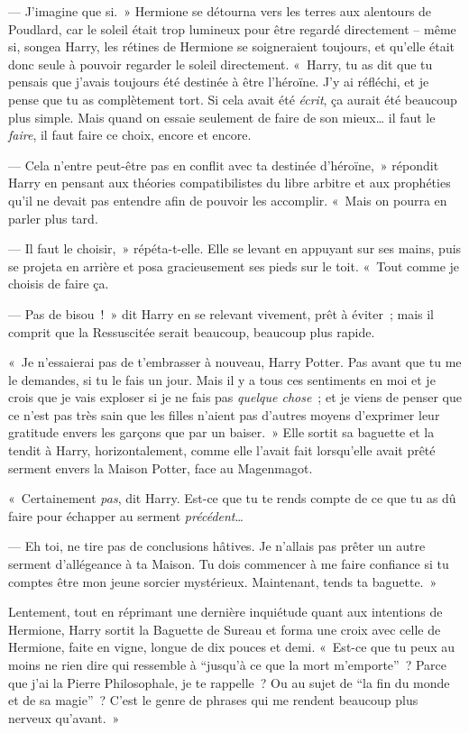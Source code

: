 --- J'imagine que si.~» Hermione se détourna vers les terres aux alentours de Poudlard, car le soleil était trop lumineux pour être regardé directement -- même si, songea Harry, les rétines de Hermione se soigneraient toujours, et qu'elle était donc seule à pouvoir regarder le soleil directement. «~Harry, tu as dit que tu pensais que j'avais toujours été destinée à être l'héroïne. J'y ai réfléchi, et je pense que tu as complètement tort. Si cela avait été \emph{écrit}, ça aurait été beaucoup plus simple. Mais quand on essaie seulement de faire de son mieux… il faut le \emph{faire}, il faut faire ce choix, encore et encore.

--- Cela n'entre peut-être pas en conflit avec ta destinée d'héroïne,~» répondit Harry en pensant aux théories compatibilistes du libre arbitre et aux prophéties qu'il ne devait pas entendre afin de pouvoir les accomplir. «~Mais on pourra en parler plus tard.

--- Il faut le choisir,~» répéta-t-elle. Elle se levant en appuyant sur ses mains, puis se projeta en arrière et posa gracieusement ses pieds sur le toit. «~Tout comme je choisis de faire ça.

--- Pas de bisou~!~» dit Harry en se relevant vivement, prêt à éviter~; mais il comprit que la Ressuscitée serait beaucoup, beaucoup plus rapide.

«~Je n'essaierai pas de t'embrasser à nouveau, Harry Potter. Pas avant que tu me le demandes, si tu le fais un jour. Mais il y a tous ces sentiments en moi et je crois que je vais exploser si je ne fais pas \emph{quelque chose}~; et je viens de penser que ce n'est pas très sain que les filles n'aient pas d'autres moyens d'exprimer leur gratitude envers les garçons que par un baiser.~» Elle sortit sa baguette et la tendit à Harry, horizontalement, comme elle l'avait fait lorsqu'elle avait prêté serment envers la Maison Potter, face au Magenmagot.

«~Certainement \emph{pas}, dit Harry. Est-ce que tu te rends compte de ce que tu as dû faire pour échapper au serment \emph{précédent}…

--- Eh toi, ne tire pas de conclusions hâtives. Je n'allais pas prêter un autre serment d'allégeance à ta Maison. Tu dois commencer à me faire confiance si tu comptes être mon jeune sorcier mystérieux. Maintenant, tends ta baguette.~»

Lentement, tout en réprimant une dernière inquiétude quant aux intentions de Hermione, Harry sortit la Baguette de Sureau et forma une croix avec celle de Hermione, faite en vigne, longue de dix pouces et demi. «~Est-ce que tu peux au moins ne rien dire qui ressemble à “jusqu'à ce que la mort m'emporte”~? Parce que j'ai la Pierre Philosophale, je te rappelle~? Ou au sujet de “la fin du monde et de sa magie”~? C'est le genre de phrases qui me rendent beaucoup plus nerveux qu'avant.~»

